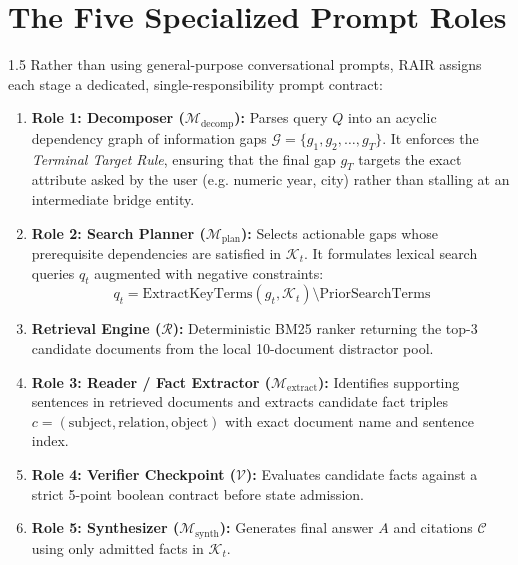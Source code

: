 \documentclass[12pt,a4paper]{report}
\begin{document}
\section{The Five Specialized Prompt Roles}
\begin{spacing}{1.5}
Rather than using general-purpose conversational prompts, RAIR assigns each stage a dedicated, single-responsibility prompt contract:
\begin{enumerate}
    \item \textbf{Role 1: Decomposer ($\mathcal{M}_{\text{decomp}}$):} Parses query $Q$ into an acyclic dependency graph of information gaps $\mathcal{G} = \{g_1, g_2, \dots, g_T\}$. It enforces the \textit{Terminal Target Rule}, ensuring that the final gap $g_T$ targets the exact attribute asked by the user (e.g. numeric year, city) rather than stalling at an intermediate bridge entity.
    \item \textbf{Role 2: Search Planner ($\mathcal{M}_{\text{plan}}$):} Selects actionable gaps whose prerequisite dependencies are satisfied in $\mathcal{K}_t$. It formulates lexical search queries $q_t$ augmented with negative constraints:
    \begin{equation}
    q_t = \text{ExtractKeyTerms}(g_t, \mathcal{K}_t) \setminus \text{PriorSearchTerms}
    \end{equation}
    \item \textbf{Retrieval Engine ($\mathcal{R}$):} Deterministic BM25 ranker returning the top-3 candidate documents from the local 10-document distractor pool.
    \item \textbf{Role 3: Reader / Fact Extractor ($\mathcal{M}_{\text{extract}}$):} Identifies supporting sentences in retrieved documents and extracts candidate fact triples $c = (\text{subject}, \text{relation}, \text{object})$ with exact document name and sentence index.
    \item \textbf{Role 4: Verifier Checkpoint ($\mathcal{V}$):} Evaluates candidate facts against a strict 5-point boolean contract before state admission.
    \item \textbf{Role 5: Synthesizer ($\mathcal{M}_{\text{synth}}$):} Generates final answer $A$ and citations $\mathcal{C}$ using only admitted facts in $\mathcal{K}_t$.
\end{enumerate}
\end{spacing}
\end{document}
